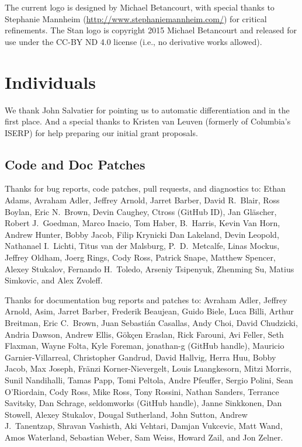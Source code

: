 The current logo is designed by Michael Betancourt, with special
thanks to Stephanie Mannheim (\url{http://www.stephaniemannheim.com/})
for critical refinements.  The Stan logo is copyright 2015 Michael
Betancourt and released for use under the CC-BY ND 4.0 license (i.e.,
no derivative works allowed).


\section*{Individuals}

We thank John Salvatier for pointing us to automatic differentiation
and \HMC in the first place.  And a special thanks to Kristen van
Leuven (formerly of Columbia's ISERP) for help preparing our initial
grant proposals.

\subsection*{Code  and Doc Patches}

Thanks for bug reports, code patches, pull requests, and diagnostics
to: 
Ethan Adams, 
Avraham Adler,
Jeffrey Arnold, 
Jarret Barber, 
David R.~Blair, 
Ross Boylan, 
Eric N.~Brown, 
Devin Caughey, 
Ctross (GitHub ID), 
Jan Gl\"ascher,
Robert J.\ Goedman, 
Marco Inacio, 
Tom Haber,
B.~Harris, 
Kevin Van Horn, 
Andrew Hunter,
Bobby Jacob, 
Filip Krynicki
Dan Lakeland, 
Devin Leopold, 
Nathanael I.~Lichti,
Titus van der Malsburg,
P.~D.~Metcalfe, 
Linas Mockus,
Jeffrey Oldham, 
Joerg Rings,
Cody Ross,
Patrick Snape,
Matthew Spencer,
Alexey Stukalov,
Fernando H.~Toledo, 
Arseniy Tsipenyuk,
Zhenming Su,
Matius Simkovic, and
Alex Zvoleff.

Thanks for documentation bug reports and patches to: 
Avraham Adler,
Jeffrey Arnold,
Asim, 
Jarret Barber, 
Frederik Beaujean,
Guido Biele,
Luca Billi, 
Arthur Breitman,
Eric C.~Brown, 
Juan Sebasti\'an Casallas,
Andy Choi, 
David Chudzicki,
Andria Dawson, 
Andrew Ellis,
G\"{o}k\c{c}en Eraslan,
Rick Farouni,
Avi Feller,
Seth Flaxman, 
Wayne Folta, 
Kyle Foreman,
jonathan-g (GitHub handle),
Mauricio Garnier-Villarreal,
Christopher Gandrud,
David Hallvig,
Herra Huu,
Bobby Jacob,
Max Joseph,
Fr\"anzi Korner-Nievergelt,
Louis Luangkesorn, 
Mitzi Morris,
Sunil Nandihalli,
Tamas Papp, 
Tomi Peltola,
Andre Pfeuffer,
Sergio Polini,
Sean O'Riordain, 
Cody Ross, 
Mike Ross, 
Tony Rossini,
Nathan Sanders, 
Terrance Savitsky,
Dan Schrage,
seldomworks (GitHub handle),
Janne Sinkkonen, 
Dan Stowell, 
Alexey Stukalov,
Dougal Sutherland, 
John Sutton,
Andrew J.~Tanentzap,
Shravan Vashisth, 
Aki Vehtari,
Damjan Vukcevic,
Matt Wand,
Amos Waterland,
Sebastian Weber, 
Sam Weiss,
Howard Zail, and
Jon Zelner.

